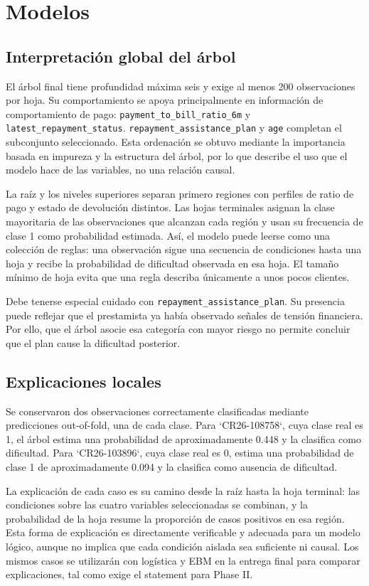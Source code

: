 \chapter{Modelos} \label{chp:models}


\section{Interpretación global del árbol}

El árbol final tiene profundidad máxima seis y exige al menos 200 observaciones
por hoja. Su comportamiento se apoya principalmente en información de
comportamiento de pago: \texttt{payment_to_bill_ratio_6m} y
\texttt{latest_repayment_status}. \texttt{repayment_assistance_plan} y \texttt{age} completan el
subconjunto seleccionado. Esta ordenación se obtuvo mediante la importancia
basada en impureza y la estructura del árbol, por lo que describe el uso que el
modelo hace de las variables, no una relación causal.

La raíz y los niveles superiores separan primero regiones con perfiles de
ratio de pago y estado de devolución distintos. Las hojas terminales asignan
la clase mayoritaria de las observaciones que alcanzan cada región y usan su
frecuencia de clase 1 como probabilidad estimada. Así, el modelo puede leerse
como una colección de reglas: una observación sigue una secuencia de
condiciones hasta una hoja y recibe la probabilidad de dificultad observada en
esa hoja. El tamaño mínimo de hoja evita que una regla describa únicamente a
unos pocos clientes.

Debe tenerse especial cuidado con \texttt{repayment_assistance_plan}. Su presencia
puede reflejar que el prestamista ya había observado señales de tensión
financiera. Por ello, que el árbol asocie esa categoría con mayor riesgo no
permite concluir que el plan cause la dificultad posterior.

\section{Explicaciones locales}

Se conservaron dos observaciones correctamente clasificadas mediante
predicciones out-of-fold, una de cada clase. Para `CR26-108758`, cuya clase
real es 1, el árbol estima una probabilidad de aproximadamente 0.448 y la
clasifica como dificultad. Para `CR26-103896`, cuya clase real es 0, estima una
probabilidad de clase 1 de aproximadamente 0.094 y la clasifica como ausencia
de dificultad.

La explicación de cada caso es su camino desde la raíz hasta la hoja terminal:
las condiciones sobre las cuatro variables seleccionadas se combinan, y la
probabilidad de la hoja resume la proporción de casos positivos en esa región.
Esta forma de explicación es directamente verificable y adecuada para un
modelo lógico, aunque no implica que cada condición aislada sea suficiente ni
causal. Los mismos casos se utilizarán con logística y EBM en la entrega final
para comparar explicaciones, tal como exige el statement para Phase II.
